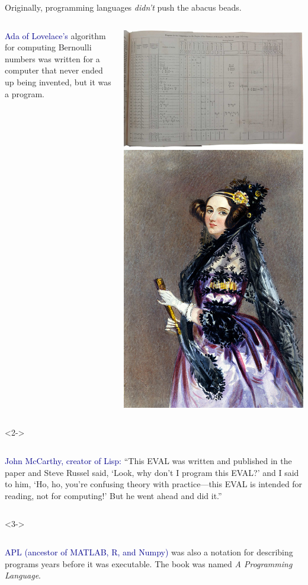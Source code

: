\documentclass[aspectratio=169]{beamer}
\begin{document}
\begin{frame}{Originally, programming languages {\it didn't} push the abacus beads.}
\vspace{0.25 cm}
\begin{columns}
\textcolor{darkblue}{Ada of Lovelace's} algorithm for computing Bernoulli numbers was written for a computer that never ended up being invented, but it was a program.

\hfill\mbox{\hspace{-1 cm}\includegraphics[height=3 cm]{ada-program.jpg}\hspace{0.5 cm}\includegraphics[height=3 cm]{ada.jpg}}
\end{columns}

\vspace{0.5 cm}
\begin{uncoverenv}<2->
\begin{columns}
\textcolor{darkblue}{John McCarthy, creator of Lisp:} ``This EVAL was written and published in the paper and Steve Russel said, `Look, why don't I program this EVAL?' and I said to him, `Ho, ho, you're confusing theory with practice---this EVAL is intended for reading, not for computing!' But he went ahead and did it.''
\end{columns}
\end{uncoverenv}

\vspace{0.5 cm}
\begin{uncoverenv}<3->
\begin{columns}
\textcolor{darkblue}{APL (ancestor of MATLAB, R, and Numpy)} was also a notation for describing programs years before it was executable. The book was named {\it A Programming Language}.
\end{columns}
\end{uncoverenv}
\end{frame}
\end{document}
